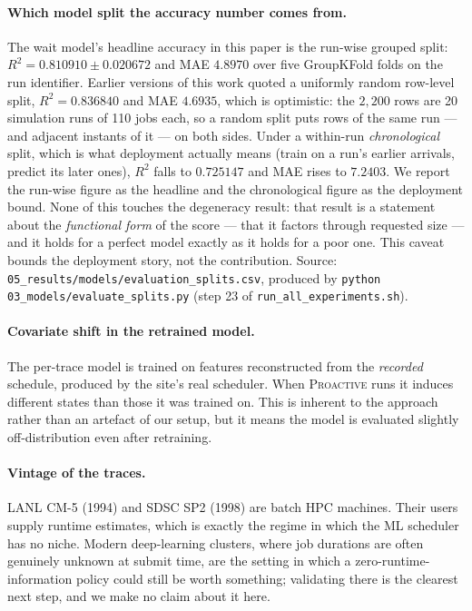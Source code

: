 \documentclass[11pt,twocolumn]{article}
\begin{document}
\paragraph{Which model split the accuracy number comes from.}
The wait model's headline accuracy in this paper is the run-wise grouped split:
$R^2 = 0.810910 \pm 0.020672$ and MAE $4.8970$ over five GroupKFold folds on the
run identifier. Earlier versions of this work quoted a uniformly random
row-level split, $R^2 = 0.836840$ and MAE $4.6935$, which is optimistic: the
$2{,}200$ rows are 20 simulation runs of 110 jobs each, so a random split puts
rows of the same run --- and adjacent instants of it --- on both sides. Under a
within-run \emph{chronological} split, which is what deployment actually means
(train on a run's earlier arrivals, predict its later ones), $R^2$ falls to
$0.725147$ and MAE rises to $7.2403$. We report the run-wise figure as the
headline and the chronological figure as the deployment bound. None of this
touches the degeneracy result: that result is a statement about the
\emph{functional form} of the score --- that it factors through requested size
--- and it holds for a perfect model exactly as it holds for a poor one. This
caveat bounds the deployment story, not the contribution.
{\small Source: \texttt{05\_results/models/evaluation\_splits.csv}, produced by
\texttt{python 03\_models/evaluate\_splits.py} (step 23 of
\texttt{run\_all\_experiments.sh}).}

\paragraph{Covariate shift in the retrained model.}
The per-trace model is trained on features reconstructed from the \emph{recorded}
schedule, produced by the site's real scheduler. When \textsc{Proactive} runs it
induces different states than those it was trained on. This is inherent to the
approach rather than an artefact of our setup, but it means the model is
evaluated slightly off-distribution even after retraining.

\paragraph{Vintage of the traces.}
LANL CM-5 (1994) and SDSC SP2 (1998) are batch HPC machines. Their users supply
runtime estimates, which is exactly the regime in which the ML scheduler has no
niche. Modern deep-learning clusters, where job durations are often genuinely
unknown at submit time, are the setting in which a zero-runtime-information
policy could still be worth something; validating there is the clearest next
step, and we make no claim about it here.
\end{document}
